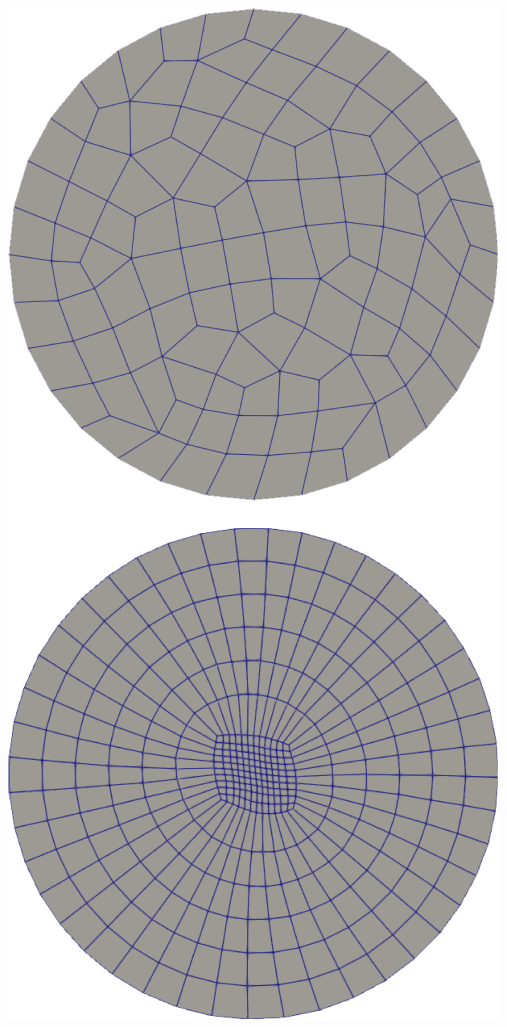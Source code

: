 \documentclass[compress,10pt,aspectratio=169]{beamer}
\begin{document}
\begin{frame}
\begin{columns}
\begin{column}{0.32\textwidth}
{    \includegraphics[scale=0.35]{images/element_quality.pdf}
\vspace{0.25cm}
}
\end{column}
\end{columns}
\end{frame}
\end{document}
